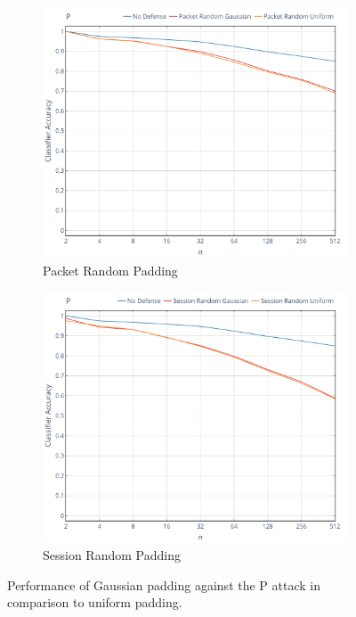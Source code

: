 \documentclass[
	ruledheaders=chapter,
	class=report,
	thesis={type=master, department=inf},
	accentcolor=1c,
	custommargins=true,
	marginpar=false,
	parskip=half-,
	fontsize=11pt,
]{tudapub}
\begin{document}
	\begin{figure}[tbp]
		\begin{subfigure}{0.495\textwidth}
			\centering
			\includegraphics[width=\textwidth]{plots/performance_p_pkt.png}
			\caption{Packet Random Padding}
		\end{subfigure}
       \hfill
		\begin{subfigure}{0.495\textwidth}
			\centering
			\includegraphics[width=\textwidth]{plots/performance_p_ses.png}
			\caption{Session Random Padding}
		\end{subfigure}
		\caption[Performance of Gaussian padding against the P attack]{Performance of Gaussian padding against the P attack \cite{Panchenko2011} in comparison to uniform padding.}
		\label{fig:p}
	\end{figure}
\end{document}
